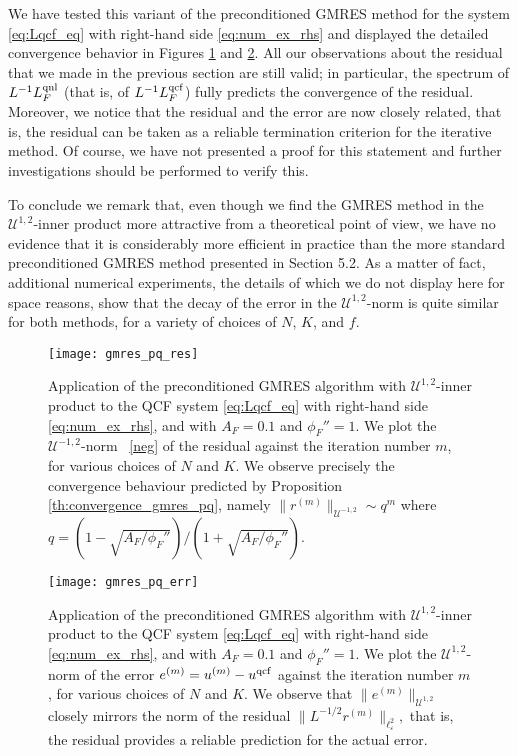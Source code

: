 \documentclass[12pt,reqno]{amsart}
\newcounter{remark}
\begin{document}
We have tested this variant of the preconditioned GMRES method for the
system \eqref{eq:Lqcf_eq} with right-hand side \eqref{eq:num_ex_rhs}
and displayed the detailed convergence behavior in Figures
\ref{fig:gmres_pq_res} and \ref{fig:gmres_pq_err}. All our
observations about the residual that we made in the previous section
are still valid; in particular, the spectrum of ${{L}}^{-1}{L^{{\rm qnl}}_F}$ (that
is, of ${{L}}^{-1}{L^{{\rm qcf}}_F}$) fully predicts the convergence of the
residual. Moreover, we notice that the residual and the error are now
closely related, that is, the residual can be taken as a reliable
termination criterion for the iterative method. Of course, we have not
presented a proof for this statement and further investigations should
be performed to verify this.

To conclude we remark that, even though we find the GMRES
method in the ${\mathcal{U}}^{1,2}$-inner product more attractive from a
theoretical point of view, we have no evidence that it is
considerably more efficient in practice than the more standard
preconditioned GMRES method presented in Section 5.2. As a
matter of fact, additional numerical experiments, the details
of which we do not display here for space reasons,  show that
the decay of the error in the ${\mathcal{U}}^{1,2}$-norm is quite similar
for both methods, for a variety of choices of $N$, $K$, and
$f$.

\begin{figure}
  \begin{center}
    \texttt{[image: gmres\_pq\_res]}
  \end{center}
  \caption{\label{fig:gmres_pq_res} Application of the preconditioned
    GMRES algorithm with ${\mathcal{U}}^{1,2}$-inner product to the QCF system
    \eqref{eq:Lqcf_eq} with right-hand side \eqref{eq:num_ex_rhs}, and with $A_F = 0.1$ and $\phi_F''
    = 1$. We
    plot the ${\mathcal{U}}^{-1,2}$-norm ~\eqref{neg} of the residual against the iteration
    number $m$, for various choices of $N$ and $K$. We observe precisely the convergence behaviour predicted by
    Proposition \ref{th:convergence_gmres_pq}, namely $\|
    r^{(m)}\|_{{\mathcal{U}}^{-1,2}} \sim q^m$ where $q = (1 -
    \sqrt{A_F/\phi_F''}) / (1+\sqrt{A_F/\phi_F''})$.}
\end{figure}

\begin{figure}
  \begin{center}
    \texttt{[image: gmres\_pq\_err]}
  \end{center}
  \caption{\label{fig:gmres_pq_err} Application of the preconditioned
    GMRES algorithm with ${\mathcal{U}}^{1,2}$-inner product to the QCF system
    \eqref{eq:Lqcf_eq} with right-hand side \eqref{eq:num_ex_rhs}, and
    with $A_F = 0.1$ and $\phi_F'' = 1$. We plot the ${\mathcal{U}}^{1,2}$-norm
    of the error $e^{(m)} = u^{(m)} - u^{\rm qcf}$ against the
    iteration number $m$, for various choices of $N$ and $K$. We
    observe that $\| e^{(m)} \|_{{\mathcal{U}}^{1,2}}$ closely mirrors the norm
    of the residual $\| {{L}}^{-1/2} r^{(m)}\|_{\ell^2_{\varepsilon}},$  that is, the residual
    provides a reliable prediction for the actual error. }
\end{figure}
\end{document}
